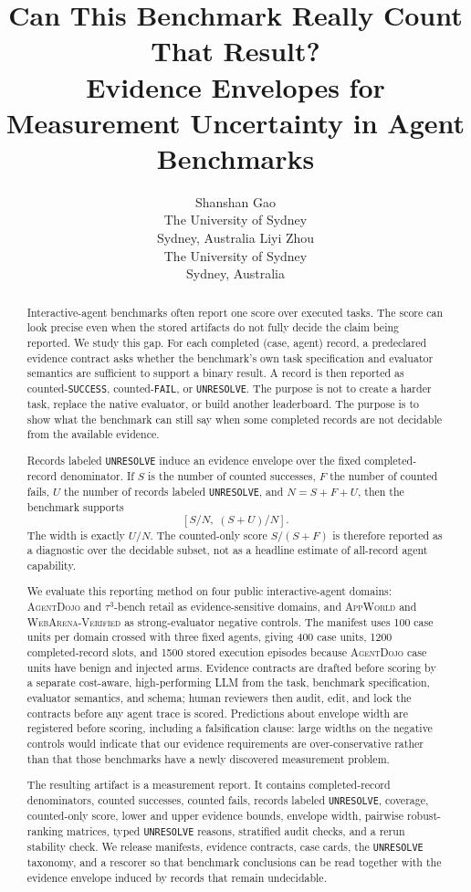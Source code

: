 \documentclass{article}
\title{Can This Benchmark Really Count That Result?\\
\large Evidence Envelopes for Measurement Uncertainty in Agent Benchmarks}
\author{
Shanshan Gao\\
The University of Sydney\\
Sydney, Australia
\And
Liyi Zhou\\
The University of Sydney\\
Sydney, Australia
}
\date{}
\newcommand{\agentdojo}{\textsc{AgentDojo}\xspace}
\newcommand{\appworld}{\textsc{AppWorld}\xspace}
\newcommand{\webarena}{\textsc{WebArena-Verified}\xspace}
\newcommand{\tauthree}{\(\tau^3\)-bench retail\xspace}
\begin{document}
\maketitle

\begin{abstract}
Interactive-agent benchmarks often report one score over executed tasks. The
score can look precise even when the stored artifacts do not fully decide the
claim being reported. We study this gap. For each completed (case, agent)
record, a predeclared evidence contract asks whether the benchmark's own task
specification and evaluator semantics are sufficient to support a binary result.
A record is then reported as counted-\texttt{SUCCESS}, counted-\texttt{FAIL},
or \texttt{UNRESOLVE}. The purpose is not to create a harder task, replace the
native evaluator, or build another leaderboard. The purpose is to show what the
benchmark can still say when some completed records are not decidable from the
available evidence.

Records labeled \texttt{UNRESOLVE} induce an evidence envelope over the fixed
completed-record denominator. If \(S\) is the number of counted successes, \(F\)
the number of counted fails, \(U\) the number of records labeled
\texttt{UNRESOLVE}, and \(N=S+F+U\), then the benchmark supports
\[
  [S/N,\; (S+U)/N].
\]
The width is exactly \(U/N\). The counted-only score \(S/(S+F)\) is therefore
reported as a diagnostic over the decidable subset, not as a headline estimate
of all-record agent capability.

We evaluate this reporting method on four public interactive-agent domains:
\agentdojo and \tauthree as evidence-sensitive domains, and \appworld and
\webarena as strong-evaluator negative controls. The manifest uses 100 case
units per domain crossed with three fixed agents, giving 400 case units, 1200
completed-record slots, and 1500 stored execution episodes because
\agentdojo case units have benign and injected arms. Evidence contracts are
drafted before scoring by a separate cost-aware, high-performing LLM from the
task, benchmark specification, evaluator semantics, and schema; human reviewers
then audit, edit, and lock the contracts before any agent trace is scored.
Predictions about envelope width are registered before scoring, including a
falsification clause: large widths on the negative controls would indicate that
our evidence requirements are over-conservative rather than that those
benchmarks have a newly discovered measurement problem.

The resulting artifact is a measurement report. It contains completed-record
denominators, counted successes, counted fails, records labeled
\texttt{UNRESOLVE}, coverage, counted-only score, lower and upper evidence
bounds, envelope width, pairwise robust-ranking matrices, typed
\texttt{UNRESOLVE} reasons, stratified audit checks, and a rerun stability
check. We release manifests, evidence contracts, case cards, the
\texttt{UNRESOLVE} taxonomy, and a rescorer so that benchmark conclusions can
be read together with the evidence envelope induced by records that remain
undecidable.
\end{abstract}
\end{document}
